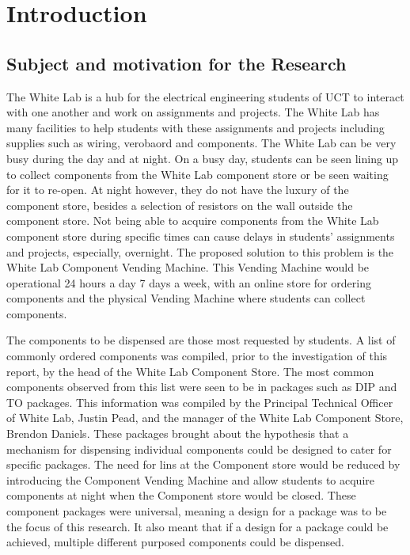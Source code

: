 \documentclass[a4paper,11pt]{article}
\numberwithin{figure}{section}
\numberwithin{table}{section}
\begin{document}
	
		
	\newpage
	
	\newpage
	\newpage
	
\pagestyle{mypage}
\section{Introduction}\thispagestyle{sectionstart}
	\subsection{Subject and motivation for the Research}
The White Lab is a hub for the electrical engineering students of UCT to interact with one another and work on assignments and projects. The White Lab has many facilities to help students with these assignments and projects including supplies such as wiring, verobaord and components. The White Lab can be very busy during the day and at night. On a busy day, students can be seen lining up to collect components from the White Lab component store or be seen waiting for it to re-open. At night however, they do not have the luxury of the component store, besides a selection of resistors on the wall outside the component store. Not being able to acquire components from the White Lab component store during specific times can cause delays in students' assignments and projects, especially, overnight. The proposed solution to this problem is the White Lab Component Vending Machine. This Vending Machine would be operational 24 hours a day 7 days a week, with an online store for ordering components and the physical Vending Machine where students can collect components. 

The components to be dispensed are those most requested by students. A list of commonly ordered components was compiled, prior to the investigation of this report, by the head of the White Lab Component Store. The most common components observed from this list were seen to be in packages such as DIP and TO packages. This information was compiled by the Principal Technical Officer of White Lab, Justin Pead, and the manager of the White Lab Component Store, Brendon Daniels. These packages brought about the hypothesis that a mechanism for dispensing individual components could be designed to cater for specific packages. The need for lins at the Component store would be reduced by introducing the Component Vending Machine and allow students to acquire components at night when the Component store would be closed. These component packages were universal, meaning a design for a package was to be the focus of this research. It also meant that if a design for a package could be achieved, multiple different purposed components could be dispensed.
\end{document}
